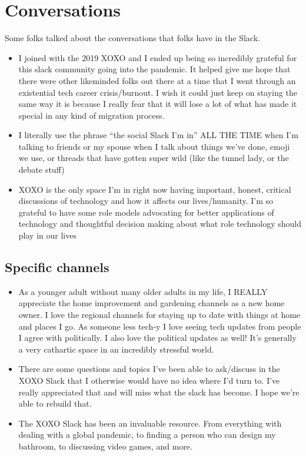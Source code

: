 \documentclass[
]{book}
\providecommand{\tightlist}{%
  \setlength{\itemsep}{0pt}\setlength{\parskip}{0pt}}
\begin{document}
\section{Conversations}\label{conversations}

Some folks talked about the conversations that folks have in the Slack.

\begin{itemize}
\tightlist
\item
  I joined with the 2019 XOXO and I ended up being so incredibly grateful for this slack community going into the pandemic. It helped give me hope that there were other likeminded folks out there at a time that I went through an existential tech career crisis/burnout. I wish it could just keep on staying the same way it is because I really fear that it will lose a lot of what has made it special in any kind of migration process.
\item
  I literally use the phrase ``the social Slack I'm in'' ALL THE TIME when I'm talking to friends or my spouse when I talk about things we've done, emoji we use, or threads that have gotten super wild (like the tunnel lady, or the debate stuff)
\item
  XOXO is the only space I'm in right now having important, honest, critical discussions of technology and how it affects our lives/humanity. I'm so grateful to have some role models advocating for better applications of technology and thoughtful decision making about what role technology should play in our lives
\end{itemize}

\subsection{Specific channels}\label{specific-channels}

\begin{itemize}
\tightlist
\item
  As a younger adult without many older adults in my life, I REALLY appreciate the home improvement and gardening channels as a new home owner. I love the regional channels for staying up to date with things at home and places I go. As someone less tech-y I love seeing tech updates from people I agree with politically. I also love the political updates as well! It's generally a very cathartic space in an incredibly stressful world.
\item
  There are some questions and topics I've been able to ask/discuss in the XOXO Slack that I otherwise would have no idea where I'd turn to. I've really appreciated that and will miss what the slack has become. I hope we're able to rebuild that.
\item
  The XOXO Slack has been an invaluable resource. From everything with dealing with a global pandemic, to finding a person who can design my bathroom, to discussing video games, and more.
\end{itemize}
\end{document}
